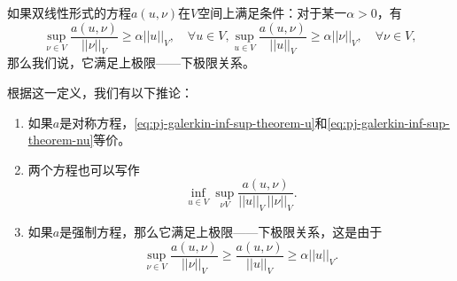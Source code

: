 \begin{subappendices}
\begin{definition}
  如果双线性形式的方程$a(u,\nu)$在$V$空间上满足条件：对于某一$\alpha > 0$，有
  \begin{subequations}
    \label{eq:pj-galerkin-inf-sup-theorem}
    \begin{equation}
      \label{eq:pj-galerkin-inf-sup-theorem-u}
      \sup_{\nu \in V} \frac{a(u,\nu)}{||\nu||_{V}} \ge \alpha ||u||_{V}, \quad \forall u \in V,
    \end{equation}
    \begin{equation}
      \label{eq:pj-galerkin-inf-sup-theorem-nu}
      \sup_{u \in V} \frac{a(u,\nu)}{||u||_{V}} \ge \alpha ||\nu||_{V}, \quad \forall \nu \in V,
    \end{equation}
  \end{subequations}
  那么我们说，它满足上极限——下极限关系。
\end{definition}
根据这一定义，我们有以下推论：
\begin{enumerate}
\item 如果$a$是对称方程，\eqref{eq:pj-galerkin-inf-sup-theorem-u}和\eqref{eq:pj-galerkin-inf-sup-theorem-nu}等价。

\item 两个方程也可以写作
\begin{equation}
  \label{eq:pj-galerkin-inf-sup-theorem-analo}
  \inf_{u \in V} \sup_{\nu V} \frac{a(u,\nu)}{||u||_{V} \, ||\nu||_{V}}.
\end{equation}

\item 如果$a$是强制方程，那么它满足上极限——下极限关系，这是由于
\begin{equation}
  \label{eq:pj-galerkin-inf-sup-theorem-coersion}
  \sup_{\nu \in V} \frac{a(u,\nu)}{||\nu||_{V}} \ge \frac{a(u,\nu)}{||u||_{V}} \ge \alpha ||u||_{V}.
\end{equation}


\end{enumerate}
\end{subappendices}
